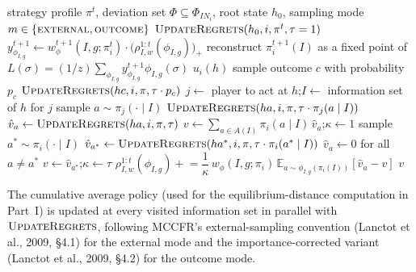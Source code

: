 \documentclass[11pt]{article}
\begin{document}
\begin{algorithm}[H]
\caption{Monte Carlo EFR: per-iteration update}
\label{alg:mcefr}
\begin{algorithmic}[1]
\Require strategy profile $\pi^t$, deviation set $\Phi \subseteq \Phi_{IN_i}$, root state $h_0$, sampling mode $m \in \{\textsc{external}, \textsc{outcome}\}$
  \State $\textsc{UpdateRegrets}(h_0, i, \pi^t, \tau = 1)$
\EndFor
{}
  \State $y_{\phi_{I,g}}^{t+1} \gets w^{t+1}_\phi(I, g; \pi_i^t) \cdot \bigl(\rho^{1:t}_{I, w}(\phi_{I,g})\bigr)_+$
\EndFor
{}
  \State reconstruct $\pi_i^{t+1}(I)$ as a fixed point of $L(\sigma) = (1/z) \sum_{\phi_{I,g}} y_{\phi_{I,g}}^{t+1} \phi_{I,g}(\sigma)$
\EndFor
\Statex
{}
    \State \Return $u_i(h)$
  \EndIf
    \State sample outcome $c$ with probability $p_c$
    \State \Return $\textsc{UpdateRegrets}(hc, i, \pi, \tau \cdot p_c)$
  \EndIf
  \State $j \gets$ player to act at $h$;\quad $I \gets$ information set of $h$ for $j$
   
    \State sample $a \sim \pi_j(\cdot \mid I)$
    \State \Return $\textsc{UpdateRegrets}(ha, i, \pi, \tau \cdot \pi_j(a \mid I))$
  \EndIf
   \label{algline:mode_branch_start}
      \State $\hat v_a \gets \textsc{UpdateRegrets}(ha, i, \pi, \tau)$
    \EndFor
    \State $v \gets \sum_{a \in A(I)} \pi_i(a \mid I)\, \hat v_a$;\quad $\kappa \gets 1$
  \Else {}
    \State sample $a^* \sim \pi_i(\cdot \mid I)$
    \State $\hat v_{a^*} \gets \textsc{UpdateRegrets}(ha^*, i, \pi, \tau \cdot \pi_i(a^* \mid I))$
    \State $\hat v_a \gets 0$ for all $a \neq a^*$ 
    \State $v \gets \hat v_{a^*}$;\quad $\kappa \gets \tau$ 
  \EndIf \label{algline:mode_branch_end}
    \State $\rho^{1:t}_{I, w}(\phi_{I,g}) \mathrel{+}= \dfrac{1}{\kappa}\, w_\phi(I, g; \pi_i)\, \mathbb{E}_{a \sim \phi_{I,g}(\pi_i(I))}[\hat v_a - v]$
  \EndFor
  \State \Return $v$
\EndProcedure
\end{algorithmic}
\end{algorithm}

The cumulative average policy (used for the equilibrium-distance computation in Part~I) is updated at every visited information set in parallel with $\textsc{UpdateRegrets}$, following MCCFR's external-sampling convention (Lanctot et al., 2009, \S4.1) for the external mode and the importance-corrected variant (Lanctot et al., 2009, \S4.2) for the outcome mode.
\end{document}
